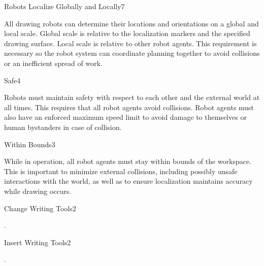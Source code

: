 \begin{functional_requirement}{Robots Localize Globally and Locally}{7}
\label{fr:localize}
\item All drawing robots can determine their locations and orientations on a global and local scale. Global scale is relative to the localization markers and the specified drawing surface. Local scale is relative to other robot agents. This requirement is necessary so the robot system can coordinate planning together to avoid collisions or an inefficient spread of work. 
\end{functional_requirement}

\begin{functional_requirement}{Safe}{4}
\label{fr:safe}
\item Robots must maintain safety with respect to each other and the external world at all times. This requires that all robot agents avoid collisions. Robot agents must also have an enforced maximum speed limit to avoid damage to themselves or human bystanders in case of collision. 
\end{functional_requirement}

\begin{functional_requirement}{Within Bounds}{3}
\label{fr:in_bounds}
\item While in operation, all robot agents must stay within bounds of the workspace. This is important to minimize external collisions, including possibly unsafe interactions with the world, as well as to ensure localization maintains accuracy while drawing occurs.
\end{functional_requirement}

\begin{functional_requirement}{Change Writing Tools}{2}
\item .
\end{functional_requirement}


\begin{functional_requirement}{Insert Writing Tools}{2}
\label{fr:insert_tool}
\item .
\end{functional_requirement}

